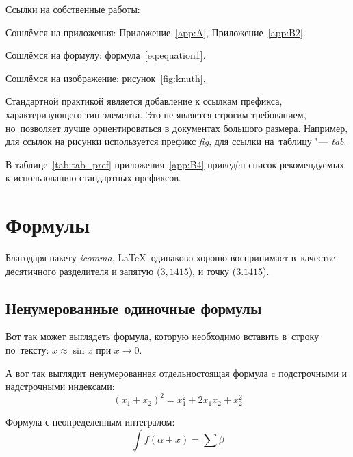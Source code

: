 %

Ссылки на собственные работы:~\cite{vakbib1, confbib1}

Сошлёмся на приложения: Приложение~\ref{app:A}, Приложение~\ref{app:B2}.

Сошлёмся на формулу: формула~\eqref{eq:equation1}.

Сошлёмся на изображение: рисунок~\ref{fig:knuth}.

Стандартной практикой является добавление к ссылкам префикса, характеризующего тип элемента.
Это не является строгим требованием, но~позволяет лучше ориентироваться в документах большого размера.
Например, для ссылок на рисунки используется префикс \textit{fig},
для ссылки на~таблицу "--- \textit{tab}.

В таблице~\ref{tab:tab_pref} приложения~\ref{app:B4} приведён список рекомендуемых
к использованию стандартных префиксов.

\section{Формулы}\label{sec:ch1/sec3}

Благодаря пакету \textit{icomma}, \LaTeX~одинаково хорошо воспринимает
в~качестве десятичного разделителя и запятую (\(3,1415\)), и точку (\(3.1415\)).

\subsection{Ненумерованные одиночные формулы}\label{subsec:ch1/sec3/sub1}

Вот так может выглядеть формула, которую необходимо вставить в~строку
по~тексту: \(x \approx \sin x\) при \(x \to 0\).

А вот так выглядит ненумерованная отдельностоящая формула c подстрочными
и надстрочными индексами:
\[
(x_1+x_2)^2 = x_1^2 + 2 x_1 x_2 + x_2^2
\]

Формула с неопределенным интегралом:
\[
\int f(\alpha+x)=\sum\beta
\]

